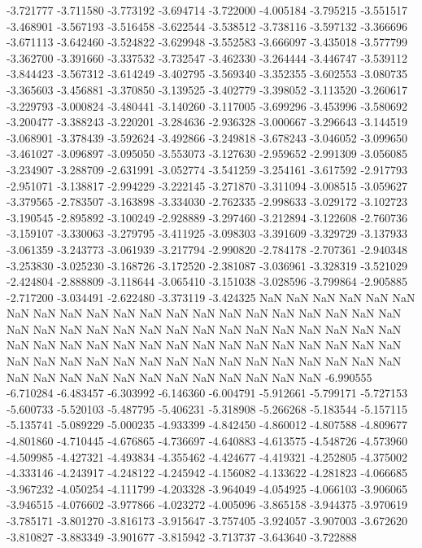 -3.721777
-3.711580
-3.773192
-3.694714
-3.722000
-4.005184
-3.795215
-3.551517
-3.468901
-3.567193
-3.516458
-3.622544
-3.538512
-3.738116
-3.597132
-3.366696
-3.671113
-3.642460
-3.524822
-3.629948
-3.552583
-3.666097
-3.435018
-3.577799
-3.362700
-3.391660
-3.337532
-3.732547
-3.462330
-3.264444
-3.446747
-3.539112
-3.844423
-3.567312
-3.614249
-3.402795
-3.569340
-3.352355
-3.602553
-3.080735
-3.365603
-3.456881
-3.370850
-3.139525
-3.402779
-3.398052
-3.113520
-3.260617
-3.229793
-3.000824
-3.480441
-3.140260
-3.117005
-3.699296
-3.453996
-3.580692
-3.200477
-3.388243
-3.220201
-3.284636
-2.936328
-3.000667
-3.296643
-3.144519
-3.068901
-3.378439
-3.592624
-3.492866
-3.249818
-3.678243
-3.046052
-3.099650
-3.461027
-3.096897
-3.095050
-3.553073
-3.127630
-2.959652
-2.991309
-3.056085
-3.234907
-3.288709
-2.631991
-3.052774
-3.541259
-3.254161
-3.617592
-2.917793
-2.951071
-3.138817
-2.994229
-3.222145
-3.271870
-3.311094
-3.008515
-3.059627
-3.379565
-2.783507
-3.163898
-3.334030
-2.762335
-2.998633
-3.029172
-3.102723
-3.190545
-2.895892
-3.100249
-2.928889
-3.297460
-3.212894
-3.122608
-2.760736
-3.159107
-3.330063
-3.279795
-3.411925
-3.098303
-3.391609
-3.329729
-3.137933
-3.061359
-3.243773
-3.061939
-3.217794
-2.990820
-2.784178
-2.707361
-2.940348
-3.253830
-3.025230
-3.168726
-3.172520
-2.381087
-3.036961
-3.328319
-3.521029
-2.424804
-2.888809
-3.118644
-3.065410
-3.151038
-3.028596
-3.799864
-2.905885
-2.717200
-3.034491
-2.622480
-3.373119
-3.424325
NaN
NaN
NaN
NaN
NaN
NaN
NaN
NaN
NaN
NaN
NaN
NaN
NaN
NaN
NaN
NaN
NaN
NaN
NaN
NaN
NaN
NaN
NaN
NaN
NaN
NaN
NaN
NaN
NaN
NaN
NaN
NaN
NaN
NaN
NaN
NaN
NaN
NaN
NaN
NaN
NaN
NaN
NaN
NaN
NaN
NaN
NaN
NaN
NaN
NaN
NaN
NaN
NaN
NaN
NaN
NaN
NaN
NaN
NaN
NaN
NaN
NaN
NaN
NaN
NaN
NaN
NaN
NaN
NaN
NaN
NaN
NaN
NaN
NaN
NaN
NaN
NaN
NaN
-6.990555
-6.710284
-6.483457
-6.303992
-6.146360
-6.004791
-5.912661
-5.799171
-5.727153
-5.600733
-5.520103
-5.487795
-5.406231
-5.318908
-5.266268
-5.183544
-5.157115
-5.135741
-5.089229
-5.000235
-4.933399
-4.842450
-4.860012
-4.807588
-4.809677
-4.801860
-4.710445
-4.676865
-4.736697
-4.640883
-4.613575
-4.548726
-4.573960
-4.509985
-4.427321
-4.493834
-4.355462
-4.424677
-4.419321
-4.252805
-4.375002
-4.333146
-4.243917
-4.248122
-4.245942
-4.156082
-4.133622
-4.281823
-4.066685
-3.967232
-4.050254
-4.111799
-4.203328
-3.964049
-4.054925
-4.066103
-3.906065
-3.946515
-4.076602
-3.977866
-4.023272
-4.005096
-3.865158
-3.944375
-3.970619
-3.785171
-3.801270
-3.816173
-3.915647
-3.757405
-3.924057
-3.907003
-3.672620
-3.810827
-3.883349
-3.901677
-3.815942
-3.713737
-3.643640
-3.722888
